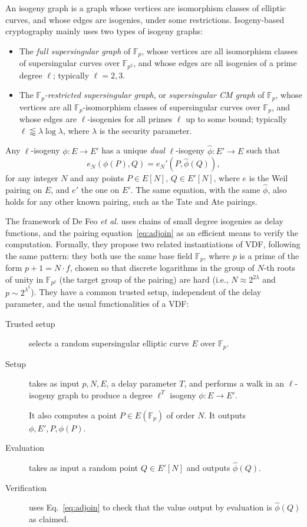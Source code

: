 \documentclass{llncs}
\newcommand{\F}{\mathbb{F}}
\begin{document}
An isogeny graph is a graph whose vertices are isomorphism classes of
elliptic curves, and whose edges are isogenies, under some
restrictions. %
Isogeny-based cryptography mainly uses two types of isogeny graphs:
\begin{itemize}
\item The \emph{full supersingular graph} of $\F_p$, whose vertices
  are all isomorphism classes of supersingular curves over $\F_{p^2}$,
  and whose edges are all isogenies of a prime degree $\ell$;
  typically $\ell=2,3$.
\item The \emph{$\F_p$-restricted supersingular graph}, or
  \emph{supersingular CM graph} of $\F_p$, whose vertices are all
  $\F_p$-isomorphism classes of supersingular curves over $\F_p$, and
  whose edges are $\ell$-isogenies for all primes $\ell$ up to some
  bound; typically $\ell\lessapprox\lambda\log\lambda$, where
  $\lambda$ is the security parameter.
\end{itemize}

Any $\ell$-isogeny $\phi:E\to E'$ has a unique \emph{dual}
$\ell$-isogeny $\hat\phi:E'\to E$ such that
\begin{equation}
  \label{eq:adjoin}
  e_N(\phi(P),Q) = e_N'(P,\hat\phi(Q)),
\end{equation}
for any integer $N$ and any points $P\in E[N]$, $Q\in E'[N]$, where
$e$ is the Weil pairing on $E$, and $e'$ the one on $E'$. %
The same equation, with the same $\hat\phi$, also holds for any other
known pairing, such as the Tate and Ate pairings.

The framework of De Feo \emph{et al.} uses chains of small degree
isogenies as delay functions, and the pairing
equation~\eqref{eq:adjoin} as an efficient means to verify the
computation. %
Formally, they propose two related instantiations of VDF, following
the same pattern: they both use the same base field $\F_p$, where $p$
is a prime of the form $p+1=N\cdot f$, chosen so that discrete
logarithms in the group of $N$-th roots of unity in $\F_{p^2}$ (the
target group of the pairing) are hard (i.e., $N\approx 2^{2\lambda}$
and $p\sim 2^{\lambda^3}$). %
They have a common trusted setup, independent of the delay parameter,
and the usual functionalities of a VDF:
\begin{description}
\item[Trusted setup] selects a random supersingular elliptic curve $E$
  over $\F_p$.
\item[Setup] takes as input $p,N,E$, a delay parameter $T$, and
  performs a walk in an $\ell$-isogeny graph to produce a degree
  $\ell^T$ isogeny $\phi:E\to E'$.
  
  It also computes a point $P\in E(\F_p)$ of order $N$. %
  It  outputs $\phi,E',P,\phi(P)$.
\item[Evaluation] takes as input a random point $Q\in E'[N]$ and outputs
  $\hat\phi(Q)$.
\item[Verification] uses Eq.~\eqref{eq:adjoin} to check that the value
  output by evaluation is $\hat\phi(Q)$ as claimed.
\end{description}
\end{document}
